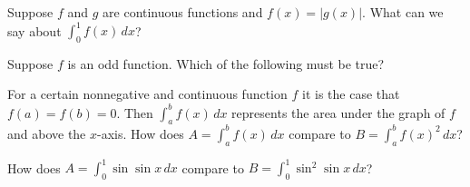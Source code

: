 \documentclass{ximera}
\newcommand{\recommendation}[1]{}
\begin{document}
\begin{shuffle}
\begin{problem}
  Suppose $f$ and $g$ are continuous functions and $f(x) = |g(x)|$.  What can we say about $\int_0^1 f(x) \, dx$?
  \begin{multipleChoice}
  \end{multipleChoice}
\end{problem}


\begin{problem}
  Suppose $f$ is an odd function. Which of the following must be true?
  \begin{multipleChoice}
  \end{multipleChoice}
\end{problem}




\begin{problem}
  For a certain nonnegative and continuous function $f$ it is the case
  that $f(a) = f(b) = 0$.  Then $\int_a^b f(x) \, dx$ represents the
  area under the graph of $f$ and above the $x$-axis.  How does $A = \int_a^b f(x) \, dx$ compare to $B = \int_a^b f(x)^2 \, dx$?
  \begin{multipleChoice}
  \end{multipleChoice}
\end{problem}

\begin{problem}
  How does $A = \int_0^1 \sin \sin x \, dx$ compare to $B = \int_0^1 \sin^2 \sin x \, dx$?
  \begin{multipleChoice}
  \end{multipleChoice}
\end{problem}


\end{shuffle}
\end{document}
